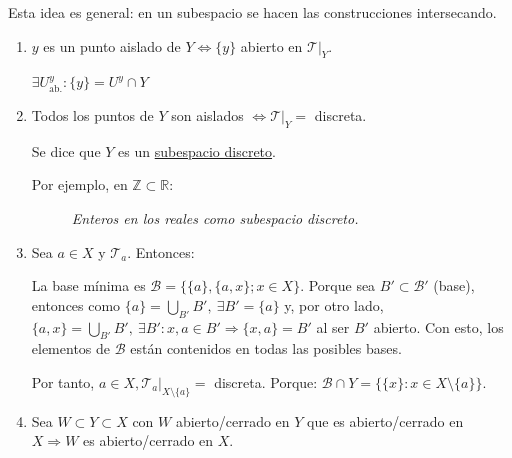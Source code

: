 Esta idea es general: en un subespacio se hacen las construcciones intersecando.

\begin{ej}
\begin{enumerate}
    \item $y$ es un punto aislado de $Y \Leftrightarrow \{y\}$ abierto en $\mathcal{T}|_Y$.
    \begin{demo}
        $\exists U^y_{\text{ab.}}: \{y\} = U^y \cap Y$
    \end{demo}

    \item Todos los puntos de $Y$ son aislados $\Leftrightarrow \mathcal{T}|_Y = $ discreta.

    Se dice que $Y$ es un \underline{subespacio discreto}. 

    Por ejemplo, en $\mathbb{Z} \subset \mathbb{R}$:    
\begin{figure}[H]
    \centering
    \caption{\textit{Enteros en los reales como subespacio discreto.}}
    \label{fig:enteros-en-los-reales-como-subespacio-discreto.}
\end{figure}

    \item Sea $a \in X$ y $\mathcal{T}_a$. Entonces:

    La base mínima es $\mathcal{B} = \{\{a\} , \{a, x\}; x \in X\}$. Porque sea $B' \subset \mathcal{B}'$ (base), entonces como $\{a\} = \bigcup_{B'} B',\ \exists B' = \{a\}$ y, por otro lado, $\{a, x\} = \bigcup_{B'} B',\ \exists B': x, a \in B' \Rightarrow \{x, a\} = B'$ al ser $B'$ abierto. Con esto, los elementos de $\mathcal{B}$ están contenidos en todas las posibles bases.

    Por tanto, $a \in X, \mathcal{T}_a|_{X \setminus \{a\}} = $ discreta. Porque: $\mathcal{B} \cap Y = \{\{x\}: x \in X\setminus \{a\}\}$.

    \item Sea $W \subset Y \subset X$ con $W$ abierto/cerrado en $Y$ que es abierto/cerrado en $X \Rightarrow W$ es abierto/cerrado en $X$.


\end{enumerate}
\end{ej}
